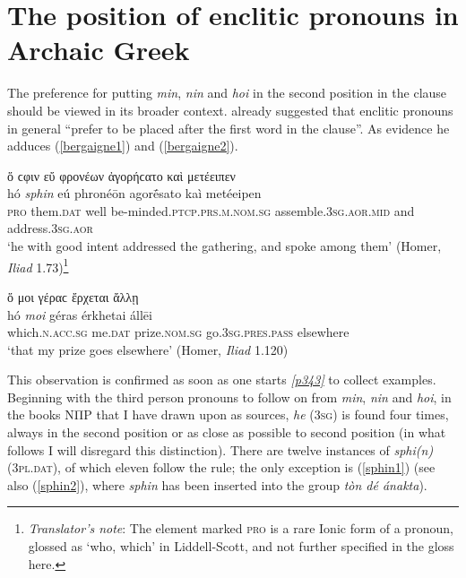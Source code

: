 \section{The position of enclitic pronouns in Archaic Greek}\label{enclitic-archaic}

The preference for putting \emph{min}, \emph{nin} and \emph{hoi} in the second position in the clause should be viewed in its broader context. \citet[177--178]{Bergaigne1877} already suggested that enclitic pronouns in general ``prefer to be placed after the first word in the clause''. As evidence he adduces (\ref{bergaigne1})
and (\ref{bergaigne2}).

\begin{exe}
\ex ὅ {ϲφιν} εὔ φρονέων ἀγορήϲατο καὶ μετέειπεν\\
\gll hó \emph{sphin} eú phronéōn agorḗsato kaì metéeipen\\
\textsc{pro} them.\textsc{dat} well be-minded.\textsc{ptcp.prs.m.nom.sg} assemble.\textsc{3sg.aor.mid} and address.\textsc{3sg.aor}\\
\trans `he with good intent addressed the gathering, and spoke among them' (Homer, \textit{Iliad} 1.73)\footnote{\emph{Translator's note}: The element marked \textsc{pro} is a rare Ionic form of a pronoun, glossed as `who, which' in Liddell-Scott, and not further specified in the gloss here.}
\label{bergaigne1}
\end{exe}

\begin{exe}
\ex ὅ {μοι} γέραϲ ἔρχεται ἄλλῃ\\
\gll hó \emph{moi} géras érkhetai állēi\\
which.\textsc{n.acc.sg} me.\textsc{dat} prize.\textsc{nom.sg} go.\textsc{3sg.pres.pass} elsewhere\\
\trans `that my prize goes elsewhere' (Homer, \textit{Iliad} 1.120)
\label{bergaigne2}
\end{exe}

This observation is confirmed as soon as one starts \hyperlink{p343}{\emph{[p343]}} to collect examples. Beginning with the third person pronouns to follow on from \emph{min}, \emph{nin} and \emph{hoi}, in the books ΝΠΡ that I have drawn upon as sources, \textit{he} (\textsc{3sg}) is found four times, always in the second position or as close as possible to second position (in what follows I will disregard this distinction). There are twelve instances of \textit{sphi(n)} (\textsc{3pl.dat}), of which eleven follow the rule; the only exception is (\ref{sphin1}) (see also (\ref{sphin2}), where \textit{sphin} has been inserted into the group \textit{tòn dé ánakta}). 

